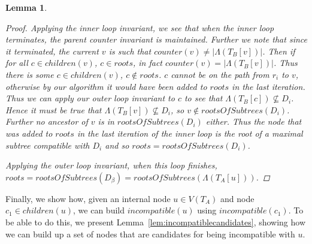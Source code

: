 \documentclass{article}
\newcommand{\leafset}{\Lambda}
\newtheorem{computerootsofsubtreescorrectness}[incompatibility]{Lemma}
\begin{document}
\begin{computerootsofsubtreescorrectness}
\begin{proof}
            Applying the inner loop invariant, we see that when the inner loop terminates, the parent counter invariant is maintained. Further we note that since it terminated, the current $v$ is such that $counter(v) \neq |\leafset(T_B[v])|$. Then if for all $c \in children(v)$, $c \in roots$, in fact $counter(v) = |\leafset(T_B[v])|$. Thus there is some $c \in children(v)$, $c \not\in roots$. $c$ cannot be on the path from $r_i$ to $v$, otherwise by our algorithm it would have been added to $roots$ in the last iteration. Thus we can apply our outer loop invariant to $c$ to see that $\leafset(T_B[c]) \not\subseteq D_i$. Hence it must be true that $\leafset(T_B[v]) \not\subseteq D_i$, so $v \not\in rootsOfSubtrees(D_i)$. Further no ancestor of $v$ is in $rootsOfSubtrees(D_i)$ either. Thus the node that was added to $roots$ in the last iteration of the inner loop is the root of a maximal subtree compatible with $D_i$ and so $roots = rootsOfSubtrees(D_i)$.

            Applying the outer loop invariant, when this loop finishes, $roots = rootsOfSubtrees(D_{\beta}) = rootsOfSubtrees(\leafset(T_A[u]))$.
        \end{proof}
    \end{computerootsofsubtreescorrectness}

    Finally, we show how, given an internal node $u \in V(T_A)$ and node $c_1 \in children(u)$, we can build $incompatible(u)$ using $incompatible(c_1)$. To be able to do this, we present Lemma~\ref{lem:incompatiblecandidates}, showing how we can build up a set of nodes that are candidates for being incompatible with $u$.
    \newline
\end{document}
